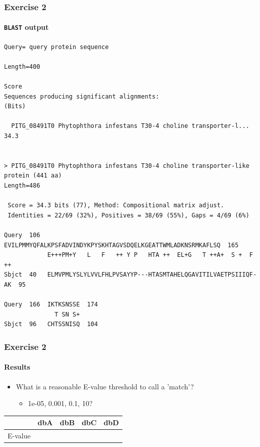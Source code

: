 \documentclass[table]{beamer}
\begin{document}
  \begin{frame}[fragile]
    \frametitle{Exercise 2}
    \framesubtitle{\texttt{BLAST} output}
    \begin{tiny}
    \begin{verbatim}
Query= query protein sequence

Length=400
                                                                      Score
Sequences producing significant alignments:                          (Bits)

  PITG_08491T0 Phytophthora infestans T30-4 choline transporter-l...  34.3


> PITG_08491T0 Phytophthora infestans T30-4 choline transporter-like 
protein (441 aa)
Length=486

 Score = 34.3 bits (77), Method: Compositional matrix adjust.
 Identities = 22/69 (32%), Positives = 38/69 (55%), Gaps = 4/69 (6%)

Query  106  EVILPMMYQFALKPSFADVINDYKPYSKHTAGVSDQELKGEATTWMLADKNSRMKAFLSQ  165
            E+++PM+Y   L   F   ++ Y P   HTA ++  EL+G   T ++A+  S +  F ++
Sbjct  40   ELMVPMLYSLYLVVLFHLPVSAYYP---HTASMTAHELQGAVITILVAETPSIIIQF-AK  95

Query  166  IKTKSNSSE  174
              T SN S+
Sbjct  96   CHTSSNISQ  104
    \end{verbatim}   
    \end{tiny} 
\end{frame}

  \begin{frame}
    \frametitle{Exercise 2}
    \framesubtitle{Results}
    \begin{itemize}
      \item What is a reasonable E-value threshold to call a 'match'?
      \begin{itemize}
        \item 1e-05, 0.001, 0.1, 10?
      \end{itemize}
    \end{itemize}
    \begin{center}
	\begin{tabular}{r|l|l|l|l}
	   & dbA & dbB & dbC & dbD \\
	  \hline
	  \hline
	  E-value &      &  &  & \\
	\end{tabular}
    \end{center}
  \end{frame}
\end{document}
